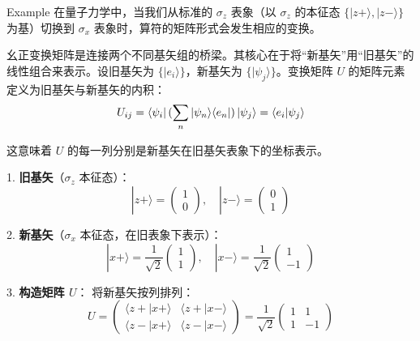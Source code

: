 \begin{problembox}{Example}
	在量子力学中，当我们从标准的 $\sigma_z$ 表象（以 $\sigma_z$ 的本征态 $\{|z+\rangle, |z-\rangle\}$ 为基）切换到 $\sigma_x$ 表象时，算符的矩阵形式会发生相应的变换。
\end{problembox}

幺正变换矩阵是连接两个不同基矢组的桥梁。其核心在于将“新基矢”用“旧基矢”的线性组合来表示。设旧基矢为 $\{|e_i\rangle\}$，新基矢为 $\{|\psi_j\rangle\}$。变换矩阵 $U$ 的矩阵元素定义为旧基矢与新基矢的内积：
\[ U_{ij} = \bra{\psi_i}( \sum_n |\psi_n\rangle \langle e_n| )\ket{\psi_j} = \langle e_i | \psi_j \rangle \]

这意味着 $U$ 的每一列分别是新基矢在旧基矢表象下的坐标表示。

1. \textbf{旧基矢}（$\sigma_z$ 本征态）：
\[ |z+\rangle = \begin{pmatrix} 1 \\ 0 \end{pmatrix}, \quad |z-\rangle = \begin{pmatrix} 0 \\ 1 \end{pmatrix} \]

2. \textbf{新基矢}（$\sigma_x$ 本征态，在旧表象下表示）：
\[ |x+\rangle = \frac{1}{\sqrt{2}} \begin{pmatrix} 1 \\ 1 \end{pmatrix}, \quad |x-\rangle = \frac{1}{\sqrt{2}} \begin{pmatrix} 1 \\ -1 \end{pmatrix} \]

3. \textbf{构造矩阵 $U$}：
将新基矢按列排列：
\[ U = \begin{pmatrix} \langle z+|x+\rangle & \langle z+|x-\rangle \\ \langle z-|x+\rangle & \langle z-|x-\rangle \end{pmatrix} = \frac{1}{\sqrt{2}} \begin{pmatrix} 1 & 1 \\ 1 & -1 \end{pmatrix} \]
